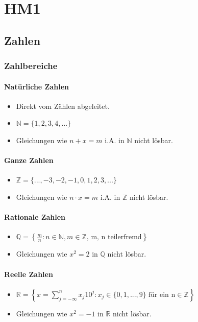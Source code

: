 \documentclass[12pt,a4paper]{report}%
\numberwithin{equation}{section}
\newcommand{\R}{\mathbb{R}} %
\newcommand{\N}{\mathbb{N}}
\newcommand{\Z}{\mathbb{Z}}
\newcommand{\Q}{\mathbb{Q}}
\numberwithin{equation}{subsection}
\begin{document}
\chapter{HM1}

\section{Zahlen}
  \subsection{Zahlbereiche}
    \subsubsection{Natürliche Zahlen}
    \begin{itemize}
      \item Direkt vom Zählen abgeleitet.
      \item $\N = \{1, 2, 3, 4, ...\}$
      \item Gleichungen wie $n+x = m$ i.A. in $\N$ nicht lösbar. 
    \end{itemize}

    \subsubsection{Ganze Zahlen}
    \begin{itemize}
      \item $\Z = \{..., -3, -2, -1, 0, 1, 2, 3, ...\}$
      \item Gleichungen wie $n \cdot x = m$ i.A. in $\Z$ nicht lösbar.
    \end{itemize}

    \subsubsection{Rationale Zahlen}
		\begin{itemize} 
			\item $\Q = \left\lbrace \frac{m}{n}: n\in \N, m \in \Z\text{, m, n teilerfremd} \right\rbrace$
			\item Gleichungen wie $x^2 = 2$ in $\Q$ nicht lösbar.
		\end{itemize}

		\subsubsection{Reelle Zahlen}
		\begin{itemize}
			\item $\R = \left\lbrace x = \sum_{j = - \infty}^n x_j 10^j : x_j \in \{0, 1, ..., 9\}\; \text{für ein n} \in \Z \right\rbrace $
			\item Gleichungen wie $x^2 = -1$ in $\R$ nicht lösbar.
		\end{itemize}
\end{document}
